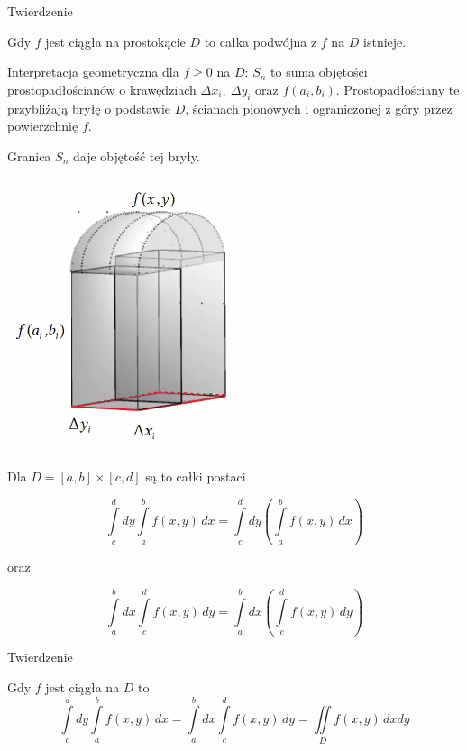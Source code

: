 \begin{tw}{Twierdzenie}

Gdy $f$ jest ciągła na prostokącie $D$ to całka podwójna z $f$ na $D$ istnieje.
\bigskip

Interpretacja geometryczna dla $ f \geq 0 $ na $D$: $S_n$ to suma objętości prostopadłościanów o krawędziach $ \Delta x_i, \ \Delta y_i $ oraz $ f(a_i, b_i) $.
Prostopadłościany te przybliżają bryłę o podstawie $D$, ścianach pionowych i ograniczonej z góry przez powierzchnię $f$.
\end{tw}


Granica $S_n$ daje objętość tej bryły.

\begin{center}
    \includegraphics[scale=0.5]{img/prostowalec.png}
\end{center}

Dla $ D = [a,b] \times [c,d] $ są to całki postaci

\[ \int\limits_c^d dy \int\limits_{a}^{b} f(x,y) \, dx = \int\limits_{c}^{d} dy \left( \int\limits_{a}^{b} f(x,y) \, dx \right) \]
\begin{center}oraz \end{center}
\[ \int\limits_a^b dx \int\limits_{c}^{d} f(x,y) \, dy = \int\limits_{a}^{b} dx \left( \int\limits_{c}^{d} f(x,y) \, dy \right) \]

\begin{tw}{Twierdzenie}

Gdy $f$ jest ciągła na $D$ to
\[ \int\limits_{c}^{d} dy \int\limits_{a}^{b} f(x,y) \, dx = \int\limits_{a}^{b} dx \int\limits_{c}^{d} f(x,y) \, dy = \iint\limits_D f(x,y) \, dxdy \]

\end{tw}

